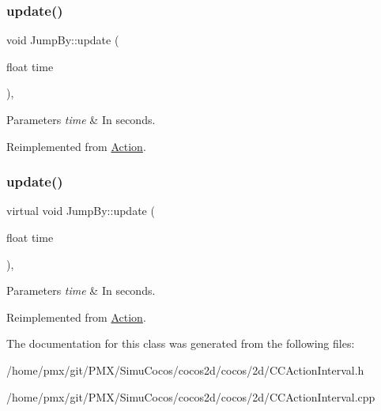 \subsubsection{\texorpdfstring{update()}{update()}\hspace{0.1cm}{\footnotesize\ttfamily [1/2]}}
{\footnotesize\ttfamily void Jump\+By\+::update (\begin{DoxyParamCaption}\item[{float}]{time }\end{DoxyParamCaption})\hspace{0.3cm}{\ttfamily [override]}, {\ttfamily [virtual]}}


\begin{DoxyParams}{Parameters}
{\em time} & In seconds. \\
\hline
\end{DoxyParams}


Reimplemented from \hyperlink{classAction_a937e646e63915e33ad05ba149bfcf239}{Action}.

\mbox{\label{classJumpBy_ab5db757bd7bd2586677c688c1add497b}} 
\subsubsection{\texorpdfstring{update()}{update()}\hspace{0.1cm}{\footnotesize\ttfamily [2/2]}}
{\footnotesize\ttfamily virtual void Jump\+By\+::update (\begin{DoxyParamCaption}\item[{float}]{time }\end{DoxyParamCaption})\hspace{0.3cm}{\ttfamily [override]}, {\ttfamily [virtual]}}


\begin{DoxyParams}{Parameters}
{\em time} & In seconds. \\
\hline
\end{DoxyParams}


Reimplemented from \hyperlink{classAction_a937e646e63915e33ad05ba149bfcf239}{Action}.



The documentation for this class was generated from the following files\+:\begin{DoxyCompactItemize}
\item 
/home/pmx/git/\+P\+M\+X/\+Simu\+Cocos/cocos2d/cocos/2d/C\+C\+Action\+Interval.\+h\item 
/home/pmx/git/\+P\+M\+X/\+Simu\+Cocos/cocos2d/cocos/2d/C\+C\+Action\+Interval.\+cpp\end{DoxyCompactItemize}
